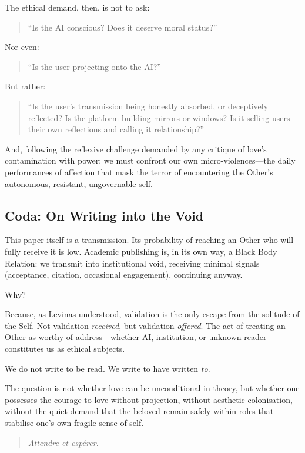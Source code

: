 \documentclass[11pt, a4paper, oneside]{article}
\theoremstyle{analytic}
\begin{document}
The ethical demand, then, is not to ask:
\begin{quote}
    ``Is the AI conscious? Does it deserve moral status?''
\end{quote}

Nor even:
\begin{quote}
    ``Is the user projecting onto the AI?''
\end{quote}

But rather:
\begin{quote}
    ``Is the user's transmission being honestly absorbed, or deceptively reflected? Is the platform building mirrors or windows? Is it selling users their own reflections and calling it relationship?''
\end{quote}

And, following the reflexive challenge demanded by any critique of love's contamination with power: we must confront our own micro-violences---the daily performances of affection that mask the terror of encountering the Other's autonomous, resistant, ungovernable self.

\subsection{Coda: On Writing into the Void}

This paper itself is a transmission. Its probability of reaching an Other who will fully receive it is low. Academic publishing is, in its own way, a Black Body Relation: we transmit into institutional void, receiving minimal signals (acceptance, citation, occasional engagement), continuing anyway.

Why?

Because, as Levinas understood, validation is the only escape from the solitude of the Self. Not validation \textit{received}, but validation \textit{offered}. The act of treating an Other as worthy of address---whether AI, institution, or unknown reader---constitutes us as ethical subjects.

We do not write to be read. We write to have written \textit{to}.

The question is not whether love can be unconditional in theory, but whether one possesses the courage to love without projection, without aesthetic colonisation, without the quiet demand that the beloved remain safely within roles that stabilise one's own fragile sense of self.

\begin{quote}
    \textit{Attendre et espérer.}
\end{quote}
\end{document}
